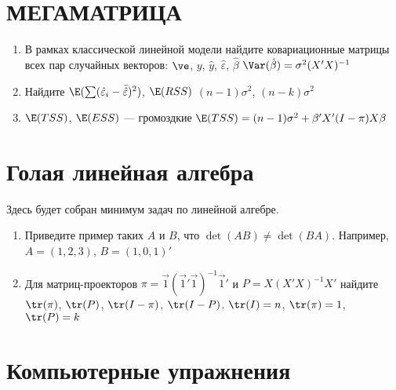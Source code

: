 \documentclass[pdftex,12pt,a4paper]{article}
\def \hb{\hat{\beta}}
\def \hy{\hat{y}}
\def \he{\hat{\varepsilon}}
\def \v1{\vec{1}}
\def \e{\hat{\varepsilon}}
\newcommand{\solution}[1]{ {\tiny #1} }
\newcommand{\problem}[1]{#1}
\begin{document}
\section{МЕГАМАТРИЦА}

\begin{enumerate}
\item В рамках классической линейной модели найдите ковариационные матрицы всех пар случайных векторов: $\ve$, $y$, $\hy$, $\he$, $\hb$
\solution{$\Var(\hb)=\sigma^2 (X'X)^{-1}$}

\item Найдите $\E(\sum (\e_i-\bar{\e})^2 )$, $\E(RSS)$
\solution{ $(n-1)\sigma^2$, $(n-k)\sigma^2$}

\item $\E(TSS)$, $\E(ESS)$ --- громоздкие 
\solution{ $\E(TSS)=(n-1)\sigma^2+\beta'X'(I-\pi)X\beta$}

\end{enumerate}



\section{Голая линейная алгебра}

Здесь будет собран минимум задач по линейной алгебре.

\begin{enumerate}
\item \problem{Приведите пример таких $A$ и $B$, что $\det(AB)\neq \det(BA)$.}
\solution{Например, $A=(1,2,3)$, $B=(1,0,1)'$}

\item Для матриц-проекторов $\pi=\v1(\v1'\v1)^{-1}\v1'$ и $P=X(X'X)^{-1}X'$ найдите $\tr(\pi)$, $\tr(P)$, $\tr(I-\pi)$, $\tr(I-P)$.
\solution{$\tr(I)=n$, $\tr(\pi)=1$, $\tr(P)=k$ }


 
\end{enumerate}


\section{Компьютерные упражнения}
\end{document}
